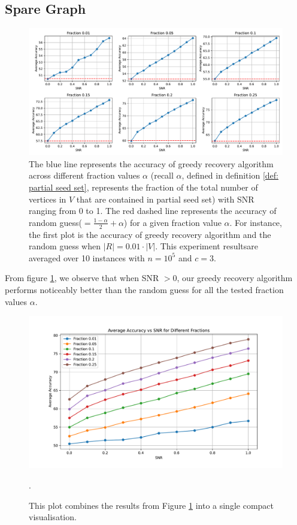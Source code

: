 \subsection{Spare Graph}
\begin{figure}[H]
    \centering
    \includegraphics[width=1\linewidth]{Figures/Greedy_Recovery_Sparse_50000_1.pdf}
    \caption[Accuracy of Greedy Recovery Algorithm in Sparse Graph with $k=2$]{The blue line represents the accuracy of greedy recovery algorithm across different fraction values $\alpha$ (recall $\alpha$, defined in definition \ref{def: partial seed set}, represents the fraction of the total number of vertices in $V$ that are contained in partial seed set) with SNR ranging from 0 to 1. The red dashed line represents the accuracy of random guess($=\frac{1-\alpha}{2}+\alpha$) for a given fraction value $\alpha$. For instance, the first plot is the accuracy of greedy recovery algorithm and the random guess when $|R|=0.01\cdot|V|.$ This experiment results\protect\footnotemark are averaged over 10 instances with $n=10^5$ and $c=3.$}
    \label{fig:greedy_sparse}
\end{figure}
From figure \ref{fig:greedy_sparse}, we observe that when SNR $>0$, our greedy recovery algorithm performs noticeably better than the random guess  for all the tested fraction values $\alpha.$
\begin{figure}[H]
    \centering
    \includegraphics[width=1\linewidth]{Figures/Greedy_Recovery_Sparse_50000_2.pdf}
    \caption[A Compact Version of Accuracy Plot]{This plot combines the results from Figure \ref{fig:greedy_sparse} into a single compact visualisation.}.
    \label{fig: compact_sparse}
\end{figure}

